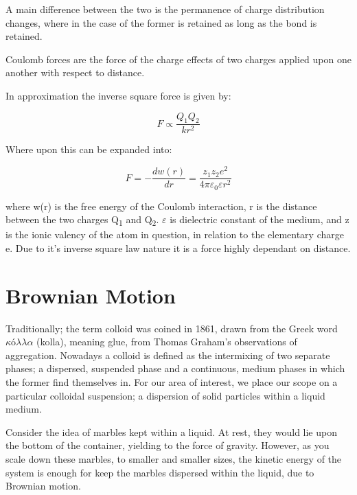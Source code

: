 A main difference between the two is the permanence of charge distribution changes, where in the case of the former is retained as long as the bond is retained.

Coulomb forces are the force of the charge effects of two charges applied upon one another with respect to distance. 

In  approximation the inverse square force is given by: %


\begin{equation}
F \propto \frac{Q_1 Q_2}{kr^2}
\end{equation}

Where upon this can be expanded into:

\begin{equation} %
F = -\frac{dw(r)}{dr} =  \frac{z_1z_2e^2}{4\pi\varepsilon_0\varepsilon r^2}
\end{equation}

where w(r) is the free energy of the Coulomb interaction, r is the distance between the two charges Q\textsubscript{1} and Q\textsubscript{2}. $\varepsilon$ is dielectric constant of the medium, and z is the ionic valency of the atom in question, in relation to the elementary charge e. Due to it's inverse square law nature it is a force highly dependant on distance. 



\section{Brownian Motion}

Traditionally; the term colloid was coined in 1861, drawn from the Greek word $κόλλα$ (kolla), meaning glue, from Thomas Graham's observations of aggregation\cite{old_colloid}. Nowadays a colloid is defined as the intermixing of two separate phases; a dispersed, suspended phase and a continuous, medium phases in which the former find themselves in. For our area of interest, we place our scope on a particular colloidal suspension; a dispersion of solid particles within a liquid medium. \cite{review_colloid1}

Consider the idea of marbles kept within a liquid. At rest, they would lie upon the bottom of the container, yielding to the force of gravity\cite{Neuton}. However, as you scale down these marbles, to smaller and smaller sizes, the kinetic energy of the system is enough for keep the marbles dispersed within the liquid, due to Brownian motion\cite{Brown}.

